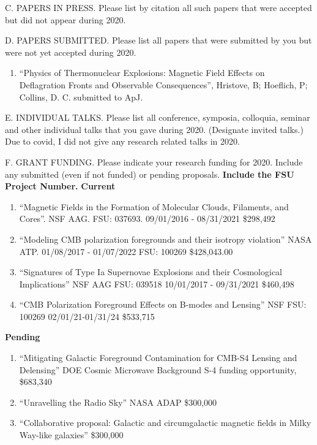 \noindent C. PAPERS IN PRESS. Please list by citation all such
papers that were accepted but did not appear during 2020.
\bigskip


\noindent D. PAPERS SUBMITTED. Please list all papers that were
submitted by you but were not yet accepted during 2020.
\bigskip

\begin{enumerate}
\item ``Physics of Thermonuclear Explosions: Magnetic Field Effects on Deflagration Fronts and Observable Consequences'', Hristove, B; Hoeflich, P; Collins, D. C. submitted to ApJ.
\end{enumerate}

\noindent E. INDIVIDUAL TALKS. Please list all conference, symposia,
colloquia, seminar and other individual talks that you gave during
2020.  (Designate invited talks.)
\bigskip
%
Due to covid, I did not give any research related talks in 2020.


\noindent F. GRANT FUNDING. Please indicate your research funding
for 2020. Include any submitted  (even if not funded) or pending
proposals.   {\bf Include the FSU Project Number.}
\bigskip
%
{\bf Current}
\begin{enumerate}
    \item ``Magnetic Fields in the Formation of Molecular Clouds,
Filaments, and Cores''.  NSF AAG. FSU: 037693.   09/01/2016 - 08/31/2021 \$298,492
\item  ``Modeling CMB polarization foregrounds and their isotropy violation''
    NASA ATP.  01/08/2017 - 01/07/2022 FSU: 100269 \$428,043.00
\item ``Signatures of Type Ia Supernovae Explosions and their Cosmological
    Implications'' NSF AAG FSU: 039518 10/01/2017 - 09/31/2021 \$460,498
\item ``CMB Polarization Foreground Effects on B-modes and Lensing'' NSF FSU:
    100269 02/01/21-01/31/24 \$533,715
\end{enumerate}

{\bf Pending}
\begin{enumerate}
    \item ``Mitigating Galactic Foreground Contamination for CMB-S4 Lensing and
        Delensing'' DOE Cosmic Microwave Background S-4 funding opportunity,
        \$683,340
    \item ``Unravelling the Radio Sky'' NASA ADAP \$300,000
    \item ``Collaborative proposal: Galactic and circumgalactic magnetic fields
        in Milky Way-like galaxies'' \$300,000
\end{enumerate}


